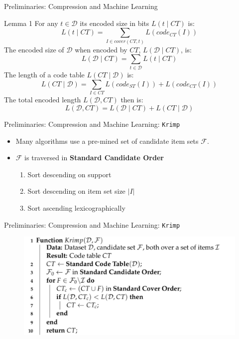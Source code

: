 \documentclass{beamer}
\newcommand{\codetable}{CT}
\newcommand{\dataset}{\mathcal{D}}
\newcommand{\setitemsets}{\mathcal{F}}
\begin{document}
\begin{frame}{Preliminaries: Compression and Machine Learning}
\begin{block}{Lemma 1}
For any $t\in\dataset$ its encoded size in bits $L(t \mid \codetable)$ is:
\[L(t \mid \codetable) = \sum\limits_{I\in cover(\codetable,t)} L(code_{\codetable}(I))\]
The encoded size of $\dataset$ when encoded by $\codetable$, $L(\dataset \mid \codetable)$, is:
\[L(\dataset\mid\codetable) = \sum\limits_{t\in\dataset} L(t\mid\codetable)\]
The length of a code table $L(\codetable \mid \dataset)$ is:
\[L(\codetable \mid \dataset) = \sum\limits_{I \in \codetable} L(code_{ST}(I)) + L(code_{\codetable}(I))\]
The total encoded length $L(\dataset, \codetable)$ then is:
\[L(\dataset, \codetable) = L(\dataset \mid \codetable) +  L(\codetable \mid \dataset)\]

\end{block}
\end{frame}

\begin{frame}{Preliminaries: Compression and Machine Learning: \texttt{Krimp}}
\begin{itemize}
	\item Many algorithms use a pre-mined set of candidate item sets $\setitemsets$.
	\item $\setitemsets$ is traversed in \textbf{Standard Candidate Order}
			\begin{enumerate}
				\item Sort descending on support
				\item Sort descending on item set size $|I|$
				\item Sort ascending lexicographically
			\end{enumerate}
\end{itemize}
\end{frame}

\begin{frame}{Preliminaries: Compression and Machine Learning: \texttt{Krimp}}
\begin{figure}[H]
  \centering
   \includegraphics[width=\textwidth]{img/krimp}
\end{figure}
\end{frame}
\end{document}
